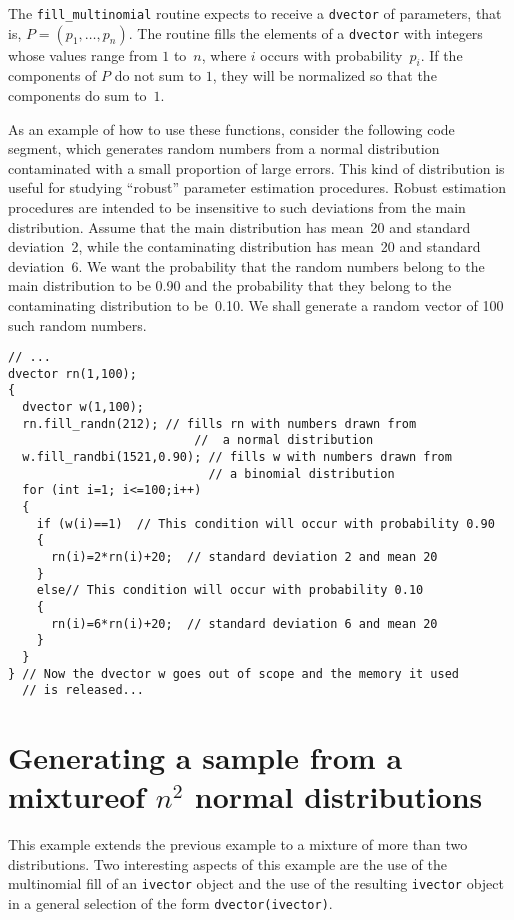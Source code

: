 \documentclass{admbmanual}
\begin{document}
The \texttt{fill\_multinomial} routine expects to receive a \texttt{dvector}
of parameters, that is, $P=(p_1,\ldots,p_n)$. The routine fills the elements of
a \texttt{dvector} with integers whose values range from $1$ to~$n$,
where $i$ occurs with probability~$p_i$.
If the components of $P$ do not sum to $1$, they will be normalized
so that the components do sum to~$1$.

As an example of how to use these functions, consider the following
code segment, which generates random numbers from a normal distribution
 contaminated with a small proportion of large errors.
This kind of distribution is useful for studying ``robust'' parameter 
estimation procedures. Robust estimation procedures are intended to
be insensitive to such deviations from the main distribution.
Assume that the main distribution has mean~20 and standard deviation~2,
while the contaminating distribution has mean~20 and standard 
deviation~6. We want the probability that the random numbers belong to
the main distribution to be 0.90 and the probability that they 
belong to the contaminating distribution to be~0.10. We shall
generate a random vector of 100 such random numbers. 
\begin{lstlisting}
// ...
dvector rn(1,100);
{
  dvector w(1,100);
  rn.fill_randn(212); // fills rn with numbers drawn from 
                          //  a normal distribution 
  w.fill_randbi(1521,0.90); // fills w with numbers drawn from 
                            // a binomial distribution   
  for (int i=1; i<=100;i++)
  {
    if (w(i)==1)  // This condition will occur with probability 0.90
    {
      rn(i)=2*rn(i)+20;  // standard deviation 2 and mean 20
    }
    else// This condition will occur with probability 0.10
    {
      rn(i)=6*rn(i)+20;  // standard deviation 6 and mean 20
    }
  }
} // Now the dvector w goes out of scope and the memory it used 
  // is released...
\end{lstlisting}


\section{Generating a sample from a mixture\br of $n^2$ normal distributions}

This example extends the previous example to a mixture of more than two
distributions. Two interesting aspects of this example are the use of
the multinomial fill of an \texttt{ivector} object and the use of the resulting
\texttt{ivector} object in a general selection of the form \texttt{dvector(ivector)}.
\end{document}
